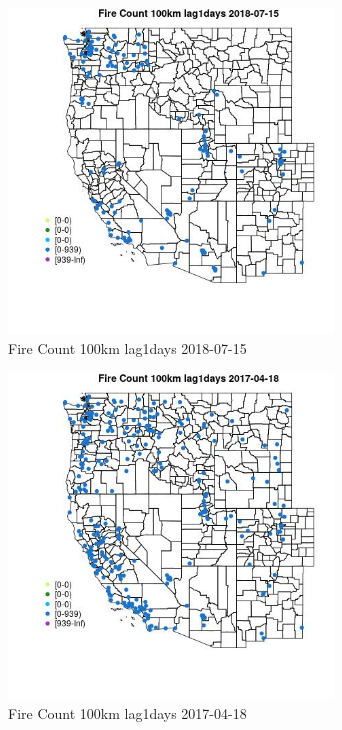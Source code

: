 \begin{figure} 
\centering  
\includegraphics[width=0.77\textwidth]{Code_Outputs/Report_ML_input_PM25_Step4_part_e_de_duplicated_aves_compiled_2019-05-21wNAs_MapObsFire_Count_100km_lag1days2018-07-15.jpg} 
\caption{\label{fig:Report_ML_input_PM25_Step4_part_e_de_duplicated_aves_compiled_2019-05-21wNAsMapObsFire_Count_100km_lag1days2018-07-15}Fire Count 100km lag1days 2018-07-15} 
\end{figure} 
 

\begin{figure} 
\centering  
\includegraphics[width=0.77\textwidth]{Code_Outputs/Report_ML_input_PM25_Step4_part_e_de_duplicated_aves_compiled_2019-05-21wNAs_MapObsFire_Count_100km_lag1days2017-04-18.jpg} 
\caption{\label{fig:Report_ML_input_PM25_Step4_part_e_de_duplicated_aves_compiled_2019-05-21wNAsMapObsFire_Count_100km_lag1days2017-04-18}Fire Count 100km lag1days 2017-04-18} 
\end{figure} 
 

